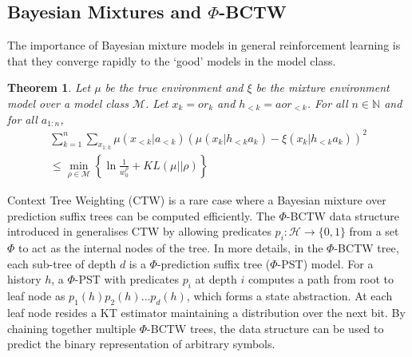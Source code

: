\documentclass[letterpaper]{article} %
\newcommand {\Hist}{\mathcal{H}}
\newcommand {\N}{\mathbb{N}}
\newtheorem{theorem}{Theorem}
\theoremstyle{definition}
\begin{document}
\subsection{Bayesian Mixtures and $\Phi$-BCTW}
The importance of Bayesian mixture models in general reinforcement learning is that they converge rapidly to the `good' models in the model class. 

\begin{theorem}\cite{Hutter:04uaibook}
	\label{thm:MEMConvergence}
	Let $\mu$ be the true environment and $\xi$ be the mixture environment model over a model class $\mathcal{M}$.
	Let $x_k = or_k$ and $h_{<k} = aor_{<k}$. For all $n \in \N$ and for all $a_{1:n}$,
	\begin{multline}
	\sum_{k=1}^{n} \sum_{x_{1:k}} \mu(x_{<k} | a_{<k}) \left( \mu(x_k | h_{<k} a_k) - \xi(x_k | h_{<k}a_k) \right)^2 \\ 
        \leq \min_{\rho \in \mathcal{M}} \left\{ \ln \frac{1}{w^\rho_0} + KL(\mu || \rho) \right\} \label{eqn:MEMBound}
	\end{multline}
\end{theorem}

Context Tree Weighting (CTW) \cite{WST95} is a rare case where a Bayesian mixture over prediction suffix trees can be computed efficiently. 
The $\Phi$-BCTW data structure introduced in \cite{yang-zhao2022a} generalises CTW by allowing predicates $p_i : \Hist \to \{0,1\}$ from a set $\Phi$ to act as the internal nodes of the tree. 
In more details, in the $\Phi$-BCTW tree, each sub-tree of depth $d$ is a $\Phi$-prediction suffix tree ($\Phi$-PST) model. For a history $h$, a $\Phi$-PST with predicates $p_i$ at depth $i$ computes a path from root to leaf node as $p_1(h)p_2(h)\ldots p_d(h)$, which forms a state abstraction. At each leaf node resides a KT estimator \cite{KT06} maintaining a distribution over the next bit. 
By chaining together multiple $\Phi$-BCTW trees, the data structure can be used to predict the binary representation of arbitrary symbols.
\end{document}
